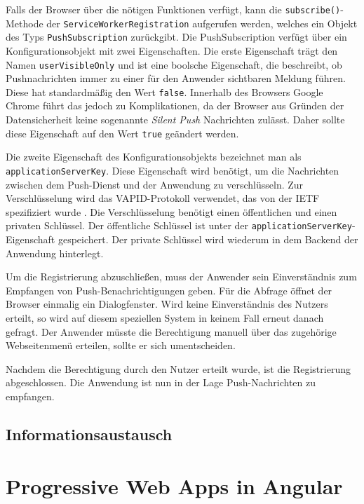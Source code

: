 Falls der Browser über die nötigen Funktionen verfügt, kann die \texttt{subscribe()}-Methode der \texttt{ServiceWorkerRegistration} aufgerufen werden, welches ein Objekt des Typs \texttt{PushSubscription} zurückgibt. 
Die PushSubscription verfügt über ein Konfigurationsobjekt mit zwei Eigenschaften. Die erste Eigenschaft trägt den Namen \texttt{userVisibleOnly} und ist eine boolsche Eigenschaft, die  beschreibt, ob Pushnachrichten immer zu einer für den Anwender sichtbaren Meldung führen. Diese hat standardmäßig den Wert \texttt{false}. Innerhalb des Browsers Google Chrome führt das jedoch zu Komplikationen, da der Browser aus Gründen der Datensicherheit keine sogenannte \textit{Silent Push} Nachrichten zulässt. Daher sollte diese Eigenschaft auf den Wert \texttt{true} geändert werden. 

Die zweite Eigenschaft des Konfigurationsobjekts bezeichnet man als \texttt{applicationServerKey}. Diese Eigenschaft wird benötigt, um die Nachrichten zwischen dem Push-Dienst und der Anwendung zu verschlüsseln. Zur Verschlüsselung wird das \ac{VAPID}-Protokoll verwendet, das von der IETF spezifiziert wurde \cite{rfc8292}. Die Verschlüsselung benötigt einen öffentlichen und einen privaten Schlüssel. Der öffentliche Schlüssel ist unter der \texttt{applicationServerKey}-Eigenschaft gespeichert. Der private Schlüssel wird wiederum in dem Backend der Anwendung hinterlegt. 

Um die Registrierung abzuschließen, muss der Anwender sein Einverständnis zum Empfangen von Push-Benachrichtigungen geben. Für die Abfrage öffnet der Browser einmalig ein Dialogfenster. Wird keine Einverständnis des Nutzers erteilt, so wird auf diesem speziellen System in keinem Fall erneut danach gefragt. Der Anwender müsste die Berechtigung manuell über das zugehörige Webseitenmenü erteilen, sollte er sich umentscheiden. 

Nachdem die Berechtigung durch den Nutzer erteilt wurde, ist die Registrierung abgeschlossen. Die Anwendung ist nun in der Lage Push-Nachrichten zu empfangen. 

\subsection{Informationsaustausch}




\section{Progressive Web Apps in Angular}

